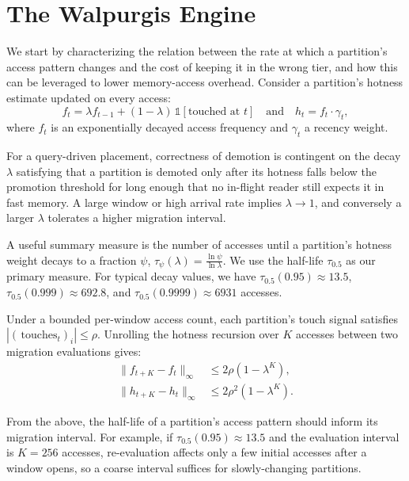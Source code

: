 \documentclass{article}
\begin{document}
\section{The Walpurgis Engine}
\label{sec:system}

We start by characterizing the relation between the rate at which a partition's
access pattern changes and the cost of keeping it in the wrong tier, and how this can
be leveraged to lower memory-access overhead. Consider a partition's hotness estimate
updated on every access:
\begin{equation}
f_t = \lambda f_{t-1} + (1 - \lambda)\,\mathbb{1}[\text{touched at } t]
\quad \text{and} \quad
h_t = f_t \cdot \gamma_t,
\end{equation}
where $f_t$ is an exponentially decayed access frequency and $\gamma_t$ a recency
weight.

For a query-driven placement, correctness of demotion is contingent on the decay
$\lambda$ satisfying that a partition is demoted only after its hotness falls below
the promotion threshold for long enough that no in-flight reader still expects it in
fast memory. A large window or high arrival rate implies $\lambda \to 1$, and
conversely a larger $\lambda$ tolerates a higher migration interval.

A useful summary measure is the number of accesses until a partition's hotness weight
decays to a fraction $\psi$, $\tau_\psi(\lambda) = \frac{\ln \psi}{\ln \lambda}$. We
use the half-life $\tau_{0.5}$ as our primary measure. For typical decay values, we
have $\tau_{0.5}(0.95) \approx 13.5$, $\tau_{0.5}(0.999) \approx 692.8$, and
$\tau_{0.5}(0.9999) \approx 6931$ accesses.

Under a bounded per-window access count, each partition's touch signal satisfies
$|(\,\text{touches}_t)_i| \leq \rho$. Unrolling the hotness recursion over $K$ accesses
between two migration evaluations gives:
\begin{align}
\|f_{t+K} - f_t\|_\infty &\leq 2\rho(1 - \lambda^K), \\
\|h_{t+K} - h_t\|_\infty &\leq 2\rho^2(1 - \lambda^K).
\end{align}

From the above, the half-life of a partition's access pattern should inform its
migration interval. For example, if $\tau_{0.5}(0.95) \approx 13.5$ and the
evaluation interval is $K = 256$ accesses, re-evaluation affects only a few initial
accesses after a window opens, so a coarse interval suffices for slowly-changing
partitions.
\end{document}
